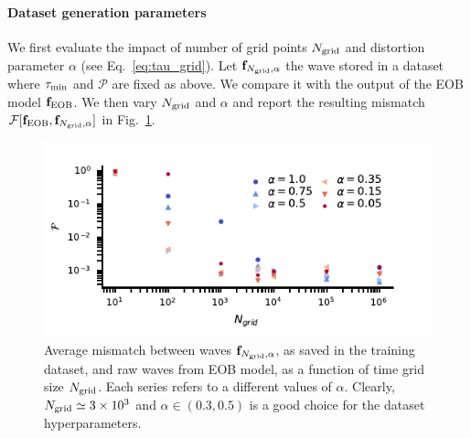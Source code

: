 \documentclass[twocolumn,showpacs,preprintnumbers,nofootinbib,prd,
superscriptaddress,10pt]{revtex4-1}
\begin{document}
\paragraph{Dataset generation parameters}
We first evaluate the impact of number of grid points $N_{\rm grid}$ and distortion parameter $\alpha$ (see Eq.~\eqref{eq:tau_grid}).
Let $\mathbf{f}_{N_{\rm grid}, \alpha}$ the wave stored in a dataset where $\tau_{\rm min}$ and $\mathcal{P}$ are fixed as above. We compare it with the output of the EOB model $\mathbf{f}_{\rm EOB}$.
We then vary $N_{\rm grid}$ and $\alpha$ and report the resulting mismatch $\mathcal{F}[\mathbf{f}_{\rm EOB}, \mathbf{f}_{N_{\rm grid}, \alpha}]$ in Fig.~\ref{fig:N_grid}.
\begin{figure}[!t]
	\centering
	\includegraphics[width=\linewidth,keepaspectratio]{img/N_grid.pdf}
	\caption{Average mismatch between waves $\mathbf{f}_{N_{\rm grid}, \alpha}$, as saved in the training dataset, and raw waves 
	from EOB model, as a function of time grid size $N_{\rm grid}$. Each series refers to a different values of $\alpha$.
	Clearly, $N_{\rm grid} \simeq 3 \times 10^{3}$ and $\alpha \in (0.3,0.5)$ is a good choice for the dataset hyperparameters.
}
	\label{fig:N_grid}
\end{figure}
\end{document}
